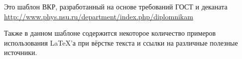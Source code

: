 \Introduction

Это шаблон ВКР, разработанный на основе требований  ГОСТ и деканата \href{http://www.phys.nsu.ru/department/index.php/diplomnikam}{http://www.phys.nsu.ru/department/index.php/diplomnikam}

Также в данном шаблоне содержится некоторое количество примеров  использования \LaTeX'а при вёрстке текста и ссылки на различные полезные источники.

